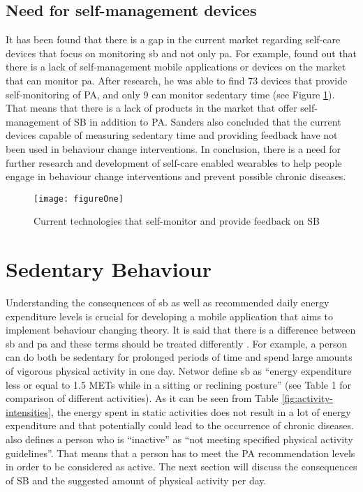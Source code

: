     \subsection{Need for self-management devices}
    It has been found that there is a gap in the current market regarding self-care devices that focus on monitoring \gls{sb} and not only \gls{pa}. For example, \citet{sanders2016} found out that there is a lack of self-management mobile applications or devices on the market that can monitor \gls{pa}. After research, he was able to find 73 devices that provide self-monitoring of PA, and only 9 can monitor sedentary time (see Figure \ref{fig:devices-to-provide-SB-feedback}). That means that there is a lack of products in the market that offer self-management of SB in addition to PA. Sanders also concluded that the current devices capable of measuring sedentary time and providing feedback have not been used in behaviour change interventions. In conclusion, there is a need for further research and development of self-care enabled wearables to help people engage in behaviour change interventions and prevent possible chronic diseases. 
    
    \begin{figure}[h]
        \centering
        \texttt{[image: figureOne]}
        \caption{Current technologies that self-monitor and provide feedback on SB \citep{sanders2016}}
        \label{fig:devices-to-provide-SB-feedback}
    \end{figure}

\section{Sedentary Behaviour}

Understanding the consequences of \gls{sb} as well as recommended daily energy expenditure levels is crucial for developing a mobile application that aims to implement behaviour changing theory. It is said that there is a difference between \gls{sb} and \gls{pa} and these terms should be treated differently \citep[540]{networ2012}. For example, a person can do both be sedentary for prolonged periods of time and spend large amounts of vigorous physical activity in one day. Networ define \gls{sb} as “energy expenditure less or equal to 1.5 METs while in a sitting or reclining posture” (see Table 1 for comparison of different activities). As it can be seen from Table \ref{fig:activity-intensities}, the energy spent in static activities does not result in a lot of energy expenditure and that potentially could lead to the occurrence of chronic diseases. \citet[540]{networ2012} also defines a person who is “inactive” as “not meeting specified physical activity guidelines”. That means that a person has to meet the PA recommendation levels in order to be considered as active. The next section will discuss the consequences of SB and the suggested amount of physical activity per day.

